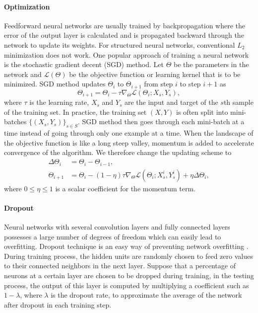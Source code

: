 \documentclass[10pt]{article}
\begin{document}
\paragraph{Optimization}
Feedforward neural networks are usually trained by backpropagation where the error of the output layer is calculated and is propagated backward through the network to update its weights. For structured neural networks, conventional $L_2$ minimization does not work.  
One popular approach of training a neural network is the stochastic gradient decent (SGD) method. Let $\Theta$ be the parameters in the network and ${\mathcal L}(\Theta)$ be the objective function or learning kernel that is to be minimized. SGD method updates $\Theta_i$ to $\Theta_{i+1}$ from step $i$ to step $i+1$ as
\begin{equation}\label{eq:SGD}
\Theta_{i+1}=\Theta_i- \tau\nabla_\Theta {\mathcal L}(\Theta_i; X_s,Y_s),
\end{equation}
where $\tau$ is the learning rate, $X_s$ and $Y_s$ are the input and target of the $s$th sample of the training set. In practice, the training set $(X,Y)$ is often split into mini-batches $\{(X_s,Y_s)\}_{s\in S}$. SGD method then goes through each mini-batch at a time instead of going through only one example at a time. When the landscape of the objective function is like a long steep valley, momentum is added to accelerate convergence of the algorithm. We therefore change the updating scheme to 
\begin{equation}\label{eq:SGDMomentum}
\begin{aligned}
\Delta\Theta_{i} &= \Theta_{i}-\Theta_{i-1}, \\
\Theta_{i+1} &= \Theta_i-(1-\eta)\tau\nabla_\Theta {\mathcal L}(\Theta_i; X^i_s,Y^i_s)+\eta\Delta\Theta_{i},
\end{aligned} 
\end{equation}
where $0\leq \eta \leq 1$ is a scalar coefficient for the momentum term.

\paragraph{Dropout} 
Neural networks with several convolution layers and fully connected layers possesses a large number of degrees of freedom which can easily lead to overfitting. Dropout technique is an easy way of preventing network overfitting \cite{srivastava2014dropout}. During training process, the hidden units are randomly chosen to feed zero values to their connected neighbors in the next layer. Suppose that a percentage   of neurons at a certain layer are chosen to be dropped during training, in the testing process, the output of this layer is computed by multiplying a coefficient such as $1-\lambda$, where $ \lambda$ is the dropout rate,  to approximate the average of the network after dropout in each training step.
\end{document}
